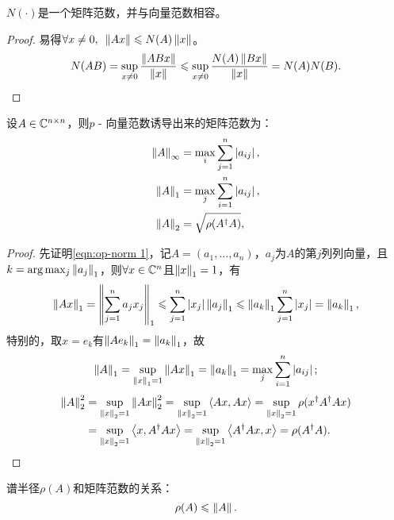\begin{theorem}
    {}{}
    $N(\cdot)$是一个矩阵范数，并与向量范数相容。 
\end{theorem}

\begin{proof}
    易得$\forall x\neq 0,\enspace\left\lVert Ax\right\rVert\leqslant N(A)\left\lVert x\right\rVert$。
    \[
        N(AB)=\sup_{x\neq 0}\frac{\left\lVert ABx\right\rVert}{\left\lVert x\right\rVert}\leqslant\sup_{x\neq 0}\frac{N(A)\left\lVert Bx\right\rVert}{\left\lVert x\right\rVert}=N(A)N(B).
        \qedhere
    \]
\end{proof}

\noindent

\begin{example}
    {}{}
    设$A\in\mathbb C^{n\times n}$，则$p$ - 向量范数诱导出来的矩阵范数为：
    \begin{subequations}
        \begin{align}
            \label{eqn:op-norm inf}
            \left\lVert A\right\rVert_\infty&=\max_{i}\sum_{j=1}^n\left\lvert a_{ij}\right\rvert,\\
            \label{eqn:op-norm 1}
            \left\lVert A\right\rVert_1&=\max_{j}\sum_{i=1}^n\left\lvert a_{ij}\right\rvert,\\
            \label{eqn:op-norm 2}
            \left\lVert A\right\rVert_2&=\sqrt{\rho(A^\dagger A)},
        \end{align}
    \end{subequations}
    \begin{proof}
        先证明\eqref{eqn:op-norm 1}，记$A=(a_1,\ldots,a_n)$，$a_j$为$A$的第$j$列列向量，且$k=\arg\max_j\left\lVert a_j\right\rVert_1$，则$\forall x\in\mathbb C^n$且$\left\lVert x\right\rVert_1=1$，有
        \[
            \left\lVert Ax\right\rVert_1=\left\lVert\sum_{j=1}^na_jx_j\right\rVert_1\leqslant\sum_{j=1}^n\left\lvert x_j\right\rvert\left\lVert a_j\right\rVert_1\leqslant\left\lVert a_k\right\rVert_1\sum_{j=1}^n\left\lvert x_j\right\rvert=\left\lVert a_k\right\rVert_1,
        \]
        特别的，取$x=e_k$有$\left\lVert Ae_k\right\rVert_1=\left\lVert a_k\right\rVert_1$，故
        \[
            \left\lVert A\right\rVert_1=\sup_{\left\lVert x\right\rVert_1=1}\left\lVert Ax\right\rVert_1=\left\lVert a_k\right\rVert_1=\max_{j}\sum_{i=1}^n\left\lvert a_{ij}\right\rvert;
        \]
        \begin{align*}
            \left\lVert A\right\rVert_2^2&=\sup_{\left\lVert x\right\rVert_2=1}\left\lVert Ax\right\rVert_2^2=\sup_{\left\lVert x\right\rVert_2=1}\left\langle Ax,Ax\right\rangle=\sup_{\left\lVert x\right\rVert_2=1}\rho(x^\dagger A^\dagger Ax)\\
            &=\sup_{\left\lVert x\right\rVert_2=1}\left\langle x,A^\dagger Ax\right\rangle=\sup_{\left\lVert x\right\rVert_2=1}\left\langle A^\dagger Ax,x\right\rangle=\rho(A^\dagger A).
        \end{align*}
    \end{proof}
\end{example}

\begin{theorem}
    {}{}
    谱半径$\rho(A)$和矩阵范数的关系：
    \begin{equation}
        \rho(A)\leqslant\left\lVert A\right\rVert.
    \end{equation}
\end{theorem}

